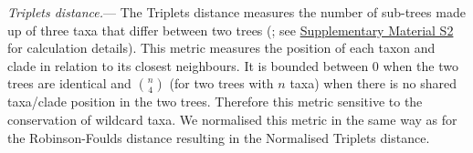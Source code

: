 \documentclass[12pt,letterpaper]{article}
\renewcommand{\subsubsection}[1]{%
\vspace{2ex}
\noindent
\textit{#1.}---}
\begin{document}
\subsubsection{Triplets distance}
The Triplets distance \citep{dobson1975triplets} measures the number of sub-trees made up of three taxa that differ between two trees (\citealt{critchlowthe1996}; see \hyperref[SupplementaryMaterial]{Supplementary Material S2} for calculation details). This metric measures the position of each taxon and clade in relation to its closest neighbours. It is bounded between 0 when the two trees are identical and $\binom{n}{4}$ (for two trees with $n$ taxa) when there is no shared taxa/clade position in the two trees. Therefore this metric sensitive to the conservation of wildcard taxa. We normalised this metric in the same way as for the Robinson-Foulds distance resulting in the Normalised Triplets distance.
\end{document}
